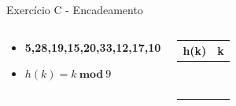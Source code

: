 \documentclass{beamer}
\begin{document}
\begin{frame}{Exercício C - Encadeamento}
\begin{columns}
        \footnotesize         
        \begin{block}{}
 		 \begin{itemize}
 		  \item \textbf{5,28,19,15,20,33,12,17,10}
 		  \item $h(k) = k \ \mathbf{mod} \ 9$  
 		 \end{itemize}

 		  \end{block} 
    
        \begin{table}[]
        \centering
        \footnotesize
        \begin{tabular}{|l|l|}
        \hline
        h(k) & k \\ \hline
            &   \\ \hline
            &   \\ \hline
            &   \\ \hline
            &   \\ \hline
            &   \\ \hline
            &   \\ \hline
            &   \\ \hline
            &   \\ \hline
            &   \\ \hline
        \end{tabular}%

        \end{table}       
        \end{columns}
\end{frame}
\end{document}

